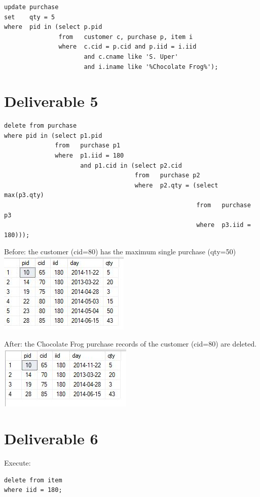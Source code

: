\documentclass{article}
\begin{document}
\begin{verbatim}
update purchase
set    qty = 5
where  pid in (select p.pid
               from   customer c, purchase p, item i
               where  c.cid = p.cid and p.iid = i.iid
                      and c.cname like 'S. Uper'
                      and i.iname like '%Chocolate Frog%');
\end{verbatim}

\section{Deliverable 5}

\begin{verbatim}
delete from purchase
where pid in (select p1.pid
              from   purchase p1
              where  p1.iid = 180
                     and p1.cid in (select p2.cid
                                    from   purchase p2
                                    where  p2.qty = (select max(p3.qty)
                                                     from   purchase p3
                                                     where  p3.iid = 180)));
\end{verbatim}

\noindent Before: the customer (cid=80) has the maximum single purchase (qty=50)\\

\includegraphics{before.jpg}

\noindent After: the Chocolate Frog purchase records of the customer (cid=80) are deleted.\\

\includegraphics{after.jpg}

\section{Deliverable 6}
Execute:
\begin{verbatim}
delete from item
where iid = 180;
\end{verbatim}
\end{document}
